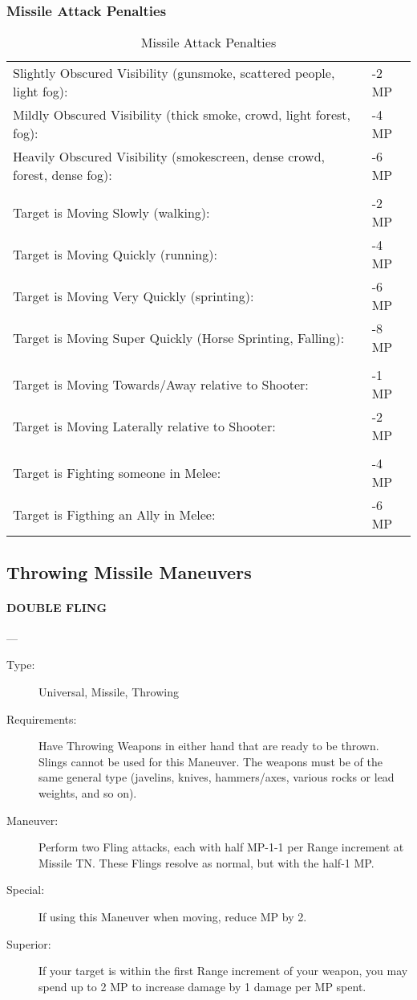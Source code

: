 \documentclass[oneside,11pt,english]{book}
\begin{document}
\subsubsection{Missile Attack Penalties}
\begin{table}[!ht]
	\caption{Missile Attack Penalties}
	\label{tab:Missile Attack Penalties}
	\begin{tabu} spread 0pt {X[5,L]X[-1,r]}
Slightly Obscured Visibility (gunsmoke, scattered people, light fog):& -2 MP \\
Mildly Obscured Visibility (thick smoke, crowd, light forest, fog):& -4 MP \\
Heavily Obscured Visibility (smokescreen, dense crowd, forest, dense fog):& -6 MP \\
	\\
Target is Moving Slowly (walking):& -2 MP \\
Target is Moving Quickly (running):& -4 MP \\
Target is Moving Very Quickly (sprinting):& -6 MP \\
Target is Moving Super Quickly (Horse Sprinting, Falling):& -8 MP \\
	\\
Target is Moving Towards/Away relative to Shooter:& -1 MP \\
Target is Moving Laterally relative to Shooter:& -2 MP \\
	\\
Target is Fighting someone in Melee:& -4 MP \\
Target is Figthing an Ally in Melee:& -6 MP \\
	\end{tabu}
\end{table}

\subsection{Throwing Missile Maneuvers}
\paragraph{\large\label{man:DOUBLE FLING} DOUBLE FLING}---\quad{\large[???????]}
\vspace{-10pt}\begin{description} 
\item [Type:] Universal, Missile, Throwing 
\item [Requirements:] Have Throwing Weapons in either hand that are ready to be thrown. Slings cannot be 
used for this Maneuver. The weapons must be of the same general type (javelins, knives, hammers/axes, 
various rocks or lead weights, and so on). 
\item [Maneuver:] Perform two Fling attacks, each with half MP-1-1 per Range increment at Missile TN. These 
Flings resolve as normal, but with the half-1 MP. 
\item [Special:] If using this Maneuver when moving, reduce MP by 2. 
\item [Superior:] If your target is within the first Range increment of your weapon, you may spend up to 2 MP to 
increase damage by 1 damage per MP spent. 
\end{description}
\end{document}
